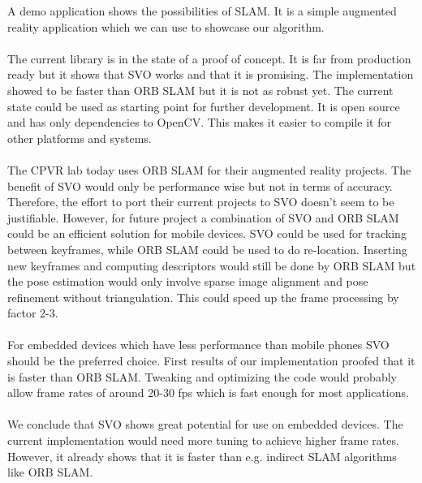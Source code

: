 \documentclass[11pt,a4paper,titlepage,oneside]{report}
\begin{document}
A demo application shows the possibilities of SLAM. It is a simple augmented reality application which we can use to showcase our algorithm.\\\\
The current library is in the state of a proof of concept. It is far from production ready but it shows that SVO works and that it is promising. The implementation showed to be faster than ORB SLAM but it is not as robust yet. The current state could be used as starting point for further development. It is open source and has only dependencies to OpenCV. This makes it easier to compile it for other platforms and systems.\\\\
The CPVR lab today uses ORB SLAM for their augmented reality projects. The benefit of SVO would only be performance wise but not in terms of accuracy. Therefore, the effort to port their current projects to SVO doesn't seem to be justifiable. However, for future project a combination of SVO and ORB SLAM could be an efficient solution for mobile devices. SVO could be used for tracking between keyframes, while ORB SLAM could be used to do re-location. Inserting new keyframes and computing descriptors would still be done by ORB SLAM but the pose estimation would only involve sparse image alignment and pose refinement without triangulation. This could speed up the frame processing by factor 2-3.\\\\
For embedded devices which have less performance than mobile phones SVO should be the preferred choice. First results of our implementation proofed that it is faster than ORB SLAM. Tweaking and optimizing the code would probably allow frame rates of around 20-30 fps which is fast enough for most applications.\\\\
We conclude that SVO shows great potential for use on embedded devices. The current implementation would need more tuning to achieve higher frame rates. However, it already shows that it is faster than e.g. indirect SLAM algorithms like ORB SLAM.

\printbibliography
\end{document}
